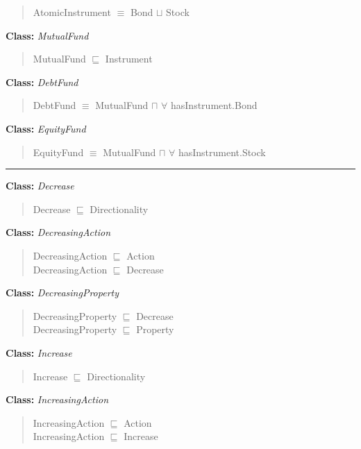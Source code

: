 \documentclass[
]{article}
\begin{document}
\begin{quote}
AtomicInstrument \(\equiv\) Bond \(\sqcup\) Stock
\end{quote}

\textbf{Class:} \emph{MutualFund}

\begin{quote}
MutualFund \(\sqsubseteq\) Instrument
\end{quote}

\textbf{Class:} \emph{DebtFund}

\begin{quote}
DebtFund \(\equiv\) MutualFund \(\sqcap\) \(\forall\) hasInstrument.Bond
\end{quote}

\textbf{Class:} \emph{EquityFund}

\begin{quote}
EquityFund \(\equiv\) MutualFund \(\sqcap\) \(\forall\)
hasInstrument.Stock
\end{quote}

\begin{center}\rule{0.5\linewidth}{0.5pt}\end{center}

\textbf{Class:} \emph{Decrease}

\begin{quote}
Decrease \(\sqsubseteq\) Directionality
\end{quote}

\textbf{Class:} \emph{DecreasingAction}

\begin{quote}
DecreasingAction \(\sqsubseteq\) Action\\
DecreasingAction \(\sqsubseteq\) Decrease
\end{quote}

\textbf{Class:} \emph{DecreasingProperty}

\begin{quote}
DecreasingProperty \(\sqsubseteq\) Decrease\\
DecreasingProperty \(\sqsubseteq\) Property
\end{quote}

\textbf{Class:} \emph{Increase}

\begin{quote}
Increase \(\sqsubseteq\) Directionality
\end{quote}

\textbf{Class:} \emph{IncreasingAction}

\begin{quote}
IncreasingAction \(\sqsubseteq\) Action\\
IncreasingAction \(\sqsubseteq\) Increase
\end{quote}
\end{document}
